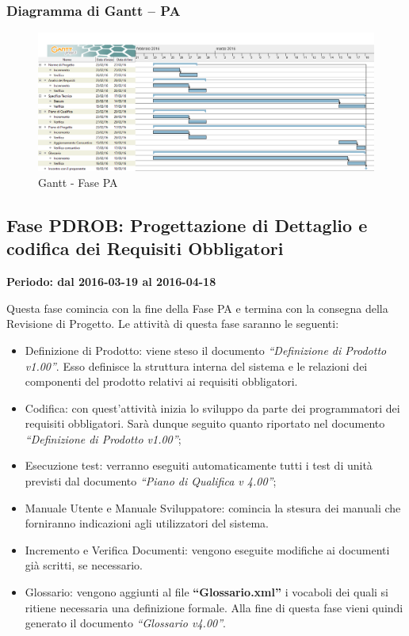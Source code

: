 \documentclass[../PianoProgetto.tex]{subfiles}
\begin{document}
		\subsubsection{Diagramma di Gantt – PA}
			\begin{figure}[!h]
				\centering
				\includegraphics[width=\textwidth]{gantt_png/3-progettazione_architetturale}
				\caption{Gantt - Fase PA}
				\label{fig:Gantt - Fase PA}
			\end{figure}
			
	\subsection{Fase PDROB: Progettazione di Dettaglio e codifica dei Requisiti Obbligatori}
		\textbf{Periodo: dal 2016-03-19 al 2016-04-18}
		
		Questa fase comincia con la fine della Fase PA e termina con la consegna della Revisione di Progetto. Le attività di questa fase saranno le seguenti:
		\begin{itemize}
			\item Definizione di Prodotto: viene steso il documento \textit{“Definizione di Prodotto v1.00”}. Esso definisce la struttura interna del sistema e le relazioni dei componenti del prodotto relativi ai requisiti obbligatori.

			\item Codifica: con quest’attività inizia lo sviluppo da parte dei programmatori dei requisiti obbligatori. Sarà dunque seguito quanto riportato nel documento \textit{“Definizione di Prodotto v1.00”};

			\item Esecuzione test: verranno eseguiti automaticamente tutti i test di unità previsti dal documento \textit{“Piano di Qualifica v 4.00”};

			\item Manuale Utente e Manuale Sviluppatore: comincia la stesura dei manuali che forniranno indicazioni agli utilizzatori del sistema.

			\item Incremento e Verifica Documenti: vengono eseguite modifiche ai documenti già scritti, se necessario.

			\item Glossario: vengono aggiunti al file \textbf{“Glossario.xml”} i vocaboli dei quali si ritiene necessaria una definizione formale. Alla fine di questa fase vieni quindi generato il documento \textit{“Glossario v4.00”}.
		\end{itemize}
\end{document}
